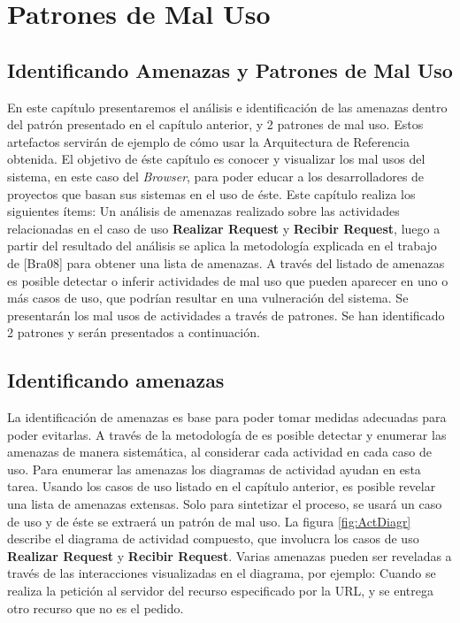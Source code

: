 \chapter{Patrones de Mal Uso}
\label{chap6:Misuse}


\section{Identificando Amenazas y Patrones de Mal Uso}
En este capítulo presentaremos el análisis e identificación de las amenazas dentro del patrón presentado en el capítulo anterior, y 2 patrones de mal uso. Estos artefactos servirán de ejemplo de cómo usar la Arquitectura de Referencia obtenida. El objetivo de éste capítulo es conocer y visualizar los mal usos del sistema, en este caso del \textit{Browser}, para poder educar a los desarrolladores de proyectos que basan sus sistemas en el uso de éste.
Este capítulo realiza los siguientes ítems: Un análisis de amenazas realizado sobre las actividades relacionadas en el caso de uso \textbf{Realizar Request} y \textbf{Recibir Request}, luego a partir del resultado del análisis se aplica la metodología explicada en el trabajo de [Bra08] para obtener una lista de amenazas. A través del listado de amenazas es posible detectar o inferir actividades de mal uso que pueden aparecer en uno o más casos de uso, que podrían resultar en una vulneración del sistema. Se presentarán los mal usos de actividades a través de patrones. Se han identificado 2 patrones y serán presentados a continuación.

\section{Identificando amenazas}
La identificación de amenazas es base para poder tomar medidas adecuadas para poder evitarlas. A través de la metodología de \cite{braz2008eliciting} es posible detectar y enumerar las amenazas de manera sistemática, al considerar cada actividad en cada caso de uso. Para enumerar las amenazas los diagramas de actividad ayudan en esta tarea.
Usando los casos de uso listado en el capítulo anterior, es posible revelar una lista de amenazas extensas. Solo para sintetizar el proceso, se usará un caso de uso y de éste se extraerá un patrón de mal uso.
La figura \ref{fig:ActDiagr} describe el diagrama de actividad compuesto, que involucra los casos de uso \textbf{Realizar Request} y \textbf{Recibir Request}. Varias amenazas pueden ser reveladas a través de las interacciones visualizadas en el diagrama, por ejemplo: Cuando se realiza la petición al servidor del recurso especificado por la URL, y se entrega otro recurso que no es el pedido. 

